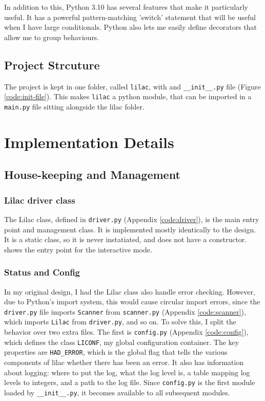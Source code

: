 \documentclass[a4paper, 11pt]{report}
\begin{document}
{{In addition to this, Python 3.10 has several features that make it particularly useful. It has a powerful pattern-matching 'switch' statement that will be useful when I have large conditionals. Python also lets me easily define decorators that allow me to group behaviours.

\subsection{Project Strcuture}

The project is kept in one folder, called \verb|lilac|, with and \verb|__init__.py| file (Figure \ref{code:init-file}). This makes \verb|lilac| a python module, that can be imported in a \verb|main.py| file sitting alongside the lilac folder.

\section{Implementation Details}
\subsection{House-keeping and Management}
\subsubsection{Lilac driver class}

The Lilac class, defined in \verb|driver.py| (Appendix \ref{code:driver}), is the main entry point and management class. It is implemented mostly identically to the design. It is a static class, so it is never instatiated, and does not have a constructor. shows the entry point for the interactive mode.

\subsubsection{Status and Config}

In my original design, I had the Lilac class also handle error checking. However, due to Python's import system, this would cause circular import errors, since the \verb|driver.py| file imports \verb|Scanner| from \verb|scanner.py| (Appendix \ref{code:scanner}), which imports \verb|Lilac| from \verb|driver.py|, and so on. To solve this, I split the behavior over two extra files. The first is \verb|config.py| (Appendix \ref{code:config}), which defines the class \verb|LICONF|, my global configuration container. The key properties are \verb|HAD_ERROR|, which is the global flag that tells the various components of lilac whether there has been an error. It also has information about logging: where to put the log, what the log level is, a table mapping log levels to integers, and a path to the log file. Since \verb|config.py| is the first module loaded by \verb|__init__.py|, it becomes available to all subsequent modules. 

}}
\end{document}
